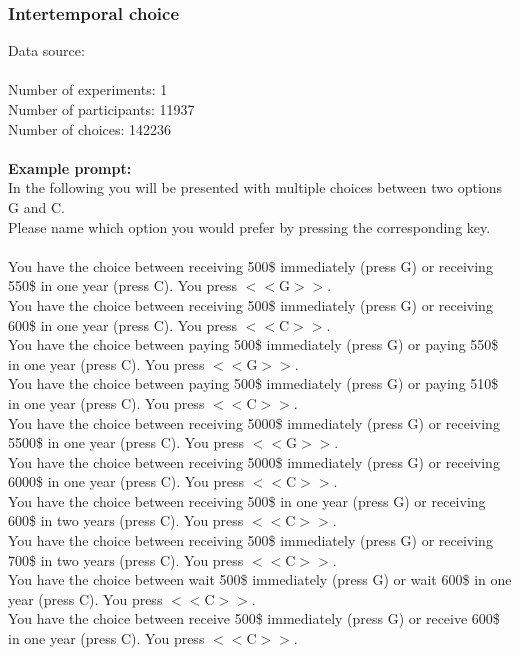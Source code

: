 \documentclass[pdflatex,sn-nature]{sn-jnl}%
\theoremstyle{thmstyleone}%
\theoremstyle{thmstyletwo}%
\theoremstyle{thmstylethree}%
\begin{document}
\subsubsection*{Intertemporal choice}
Data source: \cite{ruggeri2022globalizability} \\ $~$ \\
Number of experiments: 1 $~$\\ 
Number of participants: 11937 $~$\\ 
Number of choices: 142236 $~$\\ 
 $~$\\ 
\textbf{Example prompt:}
 $~$\\ 
In the following you will be presented with multiple choices between two options G and C. $~$\\ 
Please name which option you would prefer by pressing the corresponding key. $~$\\ 
 $~$\\ 
You have the choice between receiving 500\$ immediately (press G) or receiving 550\$ in one year (press C). You press $<<$G$>>$. $~$\\ 
You have the choice between receiving 500\$ immediately (press G) or receiving 600\$ in one year (press C). You press $<<$C$>>$. $~$\\ 
You have the choice between paying 500\$ immediately (press G) or paying 550\$ in one year (press C). You press $<<$G$>>$. $~$\\ 
You have the choice between paying 500\$ immediately (press G) or paying 510\$ in one year (press C). You press $<<$C$>>$. $~$\\ 
You have the choice between receiving 5000\$ immediately (press G) or receiving 5500\$ in one year (press C). You press $<<$G$>>$. $~$\\ 
You have the choice between receiving 5000\$ immediately (press G) or receiving 6000\$ in one year (press C). You press $<<$C$>>$. $~$\\ 
You have the choice between receiving 500\$ in one year (press G) or receiving 600\$ in two years (press C). You press $<<$C$>>$. $~$\\ 
You have the choice between receiving 500\$ immediately (press G) or receiving 700\$ in two years (press C). You press $<<$C$>>$. $~$\\ 
You have the choice between wait 500\$ immediately (press G) or wait 600\$ in one year (press C). You press $<<$C$>>$. $~$\\ 
You have the choice between receive 500\$ immediately (press G) or receive 600\$ in one year (press C). You press $<<$C$>>$. 
\end{document}
